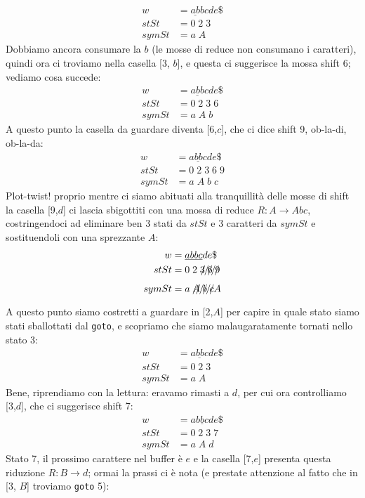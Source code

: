 \documentclass[class=book, crop=false, oneside, 12pt]{standalone}
\begin{document}
\begin{align*}
    w &= \underline{ab}bcde\$ \\
    stSt &= 0\;2\;3\\
    symSt &= a\;A
\end{align*}
Dobbiamo ancora consumare la \(b\) (le mosse di reduce non consumano i caratteri), quindi ora ci troviamo nella casella [3, \(b\)], e questa ci suggerisce la mossa shift 6; vediamo cosa succede:
\begin{align*}
    w &= \underline{abb}cde\$ \\
    stSt &= 0\;2\;3\;6\\
    symSt &= a\;A\;b
\end{align*}
A questo punto la casella da guardare diventa [6,\(c\)], che ci dice shift 9, ob-la-di, ob-la-da:
\begin{align*}
    w &= \underline{abbc}de\$ \\
    stSt &= 0\;2\;3\;6\;9\\
    symSt &= a\;A\;b\;c
\end{align*}
Plot-twist! proprio mentre ci siamo abituati alla tranquillità delle mosse di shift la casella [9,\(d\)] ci lascia sbigottiti con una mossa di reduce \(R: A \to Abc\), costringendoci ad eliminare ben 3 stati da \(stSt\) e 3 caratteri da \(symSt\) e sostituendoli con una sprezzante \(A\):
\begin{align*}
    w &= \underline{abbc}de\$ \\
    stSt &= 0\;2\;\xout{3\;6\;9}\\
    symSt &= a\;\xout{A\;b\;c}A
\end{align*}
A questo punto siamo costretti a guardare in [2,\(A\)] per capire in quale stato siamo stati sballottati dal \texttt{goto}, e scopriamo che siamo malaugaratamente tornati nello stato 3:
\begin{align*}
    w &= \underline{abbc}de\$ \\
    stSt &= 0\;2\;3\\
    symSt &= a\;A
\end{align*}
Bene, riprendiamo con la lettura: eravamo rimasti a \(d\), per cui ora controlliamo [3,\(d\)], che ci suggerisce shift 7:
\begin{align*}
    w &= \underline{abbcd}e\$ \\
    stSt &= 0\;2\;3\;7\\
    symSt &= a\;A\;d
\end{align*}
Stato 7, il prossimo carattere nel buffer è \(e\) e la casella [7,\(e\)] presenta questa riduzione \(R: B\to d\); ormai la prassi ci è nota (e prestate attenzione al fatto che in [3, \(B\)] troviamo \texttt{goto} 5):
\end{document}
